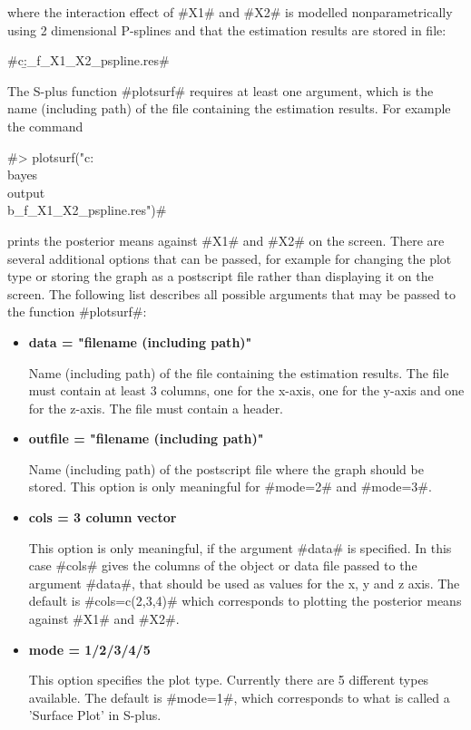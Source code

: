 where the interaction effect of #X1# and #X2# is modelled
nonparametrically using 2 dimensional P-splines and that the
estimation results are stored in file:

#c:\bayes\output\b_f_X1_X2_pspline.res#

The S-plus function #plotsurf# requires at least one argument,
which is the name (including path) of the file containing the
estimation results. For example the command

#> plotsurf("c:\\bayes\\output\\b_f_X1_X2_pspline.res")#

prints the posterior means against #X1# and #X2# on the screen.
There are several additional options that can be passed, for
example for changing the plot type or storing the graph as a
postscript file rather than displaying it on the screen. The
following list describes all possible arguments that may be passed
to the function #plotsurf#:

\begin{itemize}
\item {\bf data = "filename (including path)"}

Name (including path) of the file containing the estimation
results. The file must contain at least 3 columns, one for the
x-axis, one for the y-axis and one for the z-axis. The file must
contain a header.
\item {\bf outfile = "filename (including path)"}

Name (including path) of the postscript file where the graph
should be stored. This option is only meaningful for #mode=2# and
#mode=3#.
\item {\bf cols = 3 column vector}

This option is only meaningful, if the argument #data# is
specified. In this case #cols# gives the columns of the object or
data file passed to the argument #data#, that should be used as
values for the x, y and z axis. The default is #cols=c(2,3,4)#
which corresponds to plotting the posterior means against #X1# and
#X2#.

\item {\bf mode = 1/2/3/4/5}

This option specifies the plot type. Currently there are 5
different types available. The default is #mode=1#, which
corresponds to what is called a 'Surface Plot' in S-plus.
\end{itemize}


